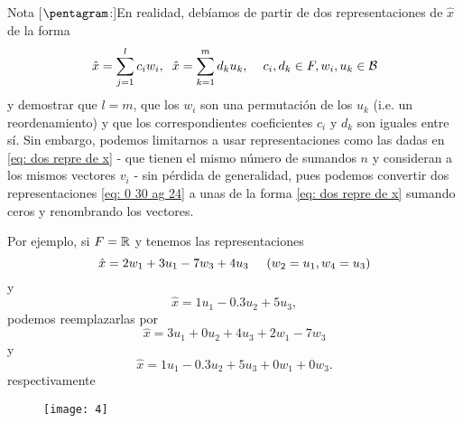 Nota [$\pentagram$:]En realidad, debíamos de partir de dos
representaciones de $\hat{x}$ de la forma
\begin{equation}
	\label{eq: 0 30 ag 24}
\hat{x} = \sum_{j=1}^{l} c_{i} w_{i},
\hspace{0.2cm}
\hat{x} = \sum_{k=1}^{m} d_{k}u_{k},
\hspace{0.4cm} c_{i}, d_{k} \in F, 
w_{i}, u_{k} \in \mathcal{B} 
\end{equation}
y demostrar que $l = m$, que los $w_{i}$ son una permutación
de los $u_{k}$ (i.e. un reordenamiento) y que los correspondientes
coeficientes $c_{i}$ y $d_{k}$ son iguales entre sí. Sin embargo,
podemos limitarnos a usar representaciones como las dadas en 
\eqref{eq: dos repre de x}
- que tienen el mismo número de sumandos $n$ y consideran a los
mismos vectores $v_{i}$ - sin pérdida de generalidad, pues podemos convertir 
dos representaciones \eqref{eq: 0 30 ag 24} a 
unas de la forma \eqref{eq: dos repre de x}
sumando ceros y renombrando los vectores.

Por ejemplo, si $F = \mathbb{R}$ y tenemos las representaciones
\[
\hat{x} = 2 w_{1} + 3 u_{1} -7w_{3} + 4 u_{3}
\hspace{0.5cm} (w_{2} = u_{1}, w_{4} = u_{3})
\]
y
\[
\hat{x} = 1u_{1} - 0.3 u_{2} + 5 u_{3},
\]
podemos reemplazarlas por
\[
\hat{x} = 3 u_{1} + 0 u_{2} + 4u_{3} + 2 w_{1} - 7 w_{3}
\]
y
\[
\hat{x} = 1u_{1} - 0.3 u_{2} + 5 u_{3} + 0 w_{1} + 0 w_{3}. 
\]
respectivamente


\begin{figure}[H]
	\centering
	\texttt{[image: 4]} 
\end{figure}	

